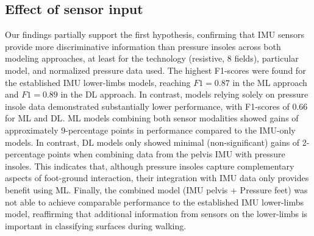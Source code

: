 \documentclass[sensors,article,submit,pdftex,moreauthors]{Definitions/mdpi}
\begin{document}
\subsection{Effect of sensor input}
Our findings partially support the first hypothesis, confirming that IMU sensors provide more discriminative information than pressure insoles across both modeling approaches, at least for the technology (resistive, 8 fields), particular model, and \textcolor{revision}{normalized} pressure data used. The highest F1-scores \textcolor{revision}{were found for the established IMU lower-limbs} models, reaching $F1=0.87$ in the ML approach and \textcolor{revision}{$F1=0.89$} in the DL approach. In contrast, models relying solely on pressure insole data demonstrated substantially lower performance, with F1-scores of \textcolor{revision}{0.66} for ML and \textcolor{revision2}{DL}. ML models combining both sensor modalities showed gains of approximately \textcolor{revision}{9-percentage} points in performance \textcolor{revision}{compared to the IMU\textcolor{revision2}{-only models}}. \textcolor{revision}{In contrast, DL models only showed minimal \textcolor{revision2}{(non-significant)} gains of 2-percentage points \textcolor{revision2}{when combining data from the pelvis IMU with pressure insoles.}} This indicates that, although pressure insoles capture complementary aspects of foot-ground interaction, their integration with IMU data only provides benefit \textcolor{revision}{using ML. Finally, the combined model (IMU \textcolor{revision2}{pelvis} + Pressure feet) was not able to achieve comparable performance to the established IMU lower-limbs model, reaffirming that additional information from sensors on the lower-limbs is important in classifying surfaces during walking.}

\end{document}
